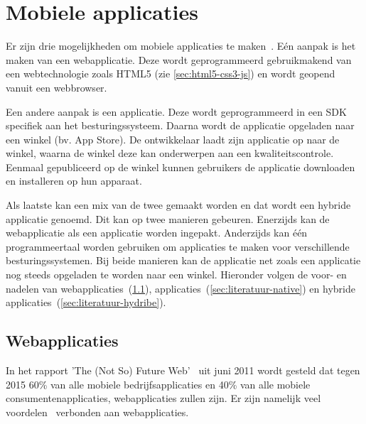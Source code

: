 


\section{Mobiele applicaties}
\label{sec:mobiele-applicaties}
Er zijn drie mogelijkheden om mobiele applicaties te maken~\cite{Accenture2012,Hales2012}. Eén aanpak is het maken van een webapplicatie.
Deze wordt geprogrammeerd gebruikmakend van een webtechnologie zoals HTML5 (zie \ref{sec:html5-css3-js}) en wordt geopend vanuit een webbrowser. 

Een andere aanpak is een  applicatie. 
Deze wordt geprogrammeerd in een SDK specifiek aan het besturingssysteem.
Daarna wordt de applicatie opgeladen naar een winkel (bv. App Store).
De ontwikkelaar laadt zijn applicatie op naar de winkel, waarna de winkel deze kan onderwerpen aan een kwaliteitscontrole.
Eenmaal gepubliceerd op de winkel kunnen gebruikers de applicatie downloaden en installeren op hun apparaat.

Als laatste kan een mix van de twee gemaakt worden en dat wordt een hybride applicatie genoemd.
Dit kan op twee manieren gebeuren.
Enerzijds kan de webapplicatie als een  applicatie worden ingepakt.
Anderzijds kan één programmeertaal worden gebruiken om  applicaties te maken voor verschillende besturingssystemen.
Bij beide manieren kan de applicatie net zoals een  applicatie nog steeds opgeladen te worden naar een winkel.
Hieronder volgen de voor- en nadelen van webapplicaties~(\ref{sec:literatuur-webapps}),  applicaties~(\ref{sec:literatuur-native}) en hybride applicaties~(\ref{sec:literatuur-hydribe}).

\subsection{Webapplicaties}
\label{sec:literatuur-webapps}
In het rapport 'The (Not So) Future Web'~\cite{Phifer2011} uit juni 2011 wordt gesteld dat tegen 2015 60\% van alle mobiele bedrijfsapplicaties en 40\% van alle mobiele consumentenapplicaties, webapplicaties zullen zijn. 
Er zijn namelijk veel voordelen~\cite{Accenture2012} verbonden aan webapplicaties.

